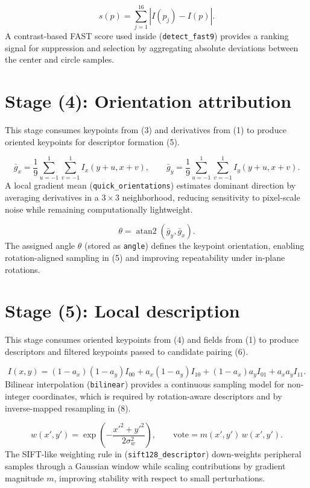 \documentclass[11pt]{article}
\begin{document}
\begin{equation}
s(p)=\sum_{j=1}^{16}\left|I(p_{j})-I(p)\right|.
\end{equation}
A contrast-based FAST score used inside (\texttt{detect\_fast9}) provides a ranking signal for suppression and selection by aggregating absolute deviations between the center and circle samples.

\section*{Stage (4): Orientation attribution}
This stage consumes keypoints from (3) and derivatives from (1) to produce oriented keypoints for descriptor formation (5).

\begin{equation}
\bar g_x=\frac{1}{9}\sum_{u=-1}^{1}\sum_{v=-1}^{1} I_x(y+u,x+v),\qquad
\bar g_y=\frac{1}{9}\sum_{u=-1}^{1}\sum_{v=-1}^{1} I_y(y+u,x+v).
\end{equation}
A local gradient mean (\texttt{quick\_orientations}) estimates dominant direction by averaging derivatives in a $3\times 3$ neighborhood, reducing sensitivity to pixel-scale noise while remaining computationally lightweight.

\begin{equation}
\theta=\operatorname{atan2}(\bar g_y,\bar g_x).
\end{equation}
The assigned angle $\theta$ (stored as \texttt{angle}) defines the keypoint orientation, enabling rotation-aligned sampling in (5) and improving repeatability under in-plane rotations.

\section*{Stage (5): Local description}
This stage consumes oriented keypoints from (4) and fields from (1) to produce descriptors and filtered keypoints passed to candidate pairing (6).

\begin{equation}
I(x,y)=(1-a_x)(1-a_y)I_{00}+a_x(1-a_y)I_{10}+(1-a_x)a_yI_{01}+a_xa_yI_{11}.
\end{equation}
Bilinear interpolation (\texttt{bilinear}) provides a continuous sampling model for non-integer coordinates, which is required by rotation-aware descriptors and by inverse-mapped resampling in (8).

\begin{equation}
w(x',y')=\exp\!\left(-\frac{x'^2+y'^2}{2\sigma_w^{2}}\right),\qquad \text{vote}=m(x',y')\,w(x',y').
\end{equation}
The SIFT-like weighting rule in (\texttt{sift128\_descriptor}) down-weights peripheral samples through a Gaussian window while scaling contributions by gradient magnitude $m$, improving stability with respect to small perturbations.
\end{document}
